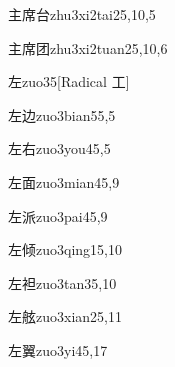 \begin{verbete}{主席台}{zhu3xi2tai2}{5,10,5}
\end{verbete}

\begin{verbete}{主席团}{zhu3xi2tuan2}{5,10,6}
\end{verbete}

\begin{verbete}{左}{zuo3}{5}[Radical 工]
\end{verbete}

\begin{verbete}{左边}{zuo3bian5}{5,5}
\end{verbete}

\begin{verbete}{左右}{zuo3you4}{5,5}
\end{verbete}

\begin{verbete}{左面}{zuo3mian4}{5,9}
\end{verbete}

\begin{verbete}{左派}{zuo3pai4}{5,9}
\end{verbete}

\begin{verbete}{左倾}{zuo3qing1}{5,10}
\end{verbete}

\begin{verbete}{左袒}{zuo3tan3}{5,10}
\end{verbete}

\begin{verbete}{左舷}{zuo3xian2}{5,11}
\end{verbete}

\begin{verbete}{左翼}{zuo3yi4}{5,17}
\end{verbete}


